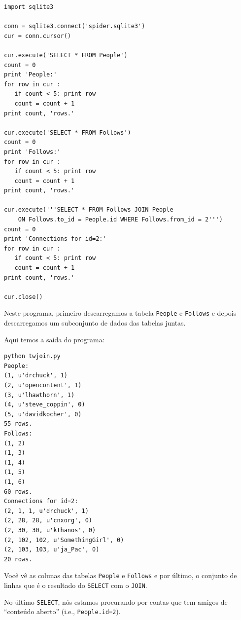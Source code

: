 \beforeverb
\begin{verbatim}
import sqlite3

conn = sqlite3.connect('spider.sqlite3')
cur = conn.cursor()

cur.execute('SELECT * FROM People')
count = 0
print 'People:'
for row in cur :
   if count < 5: print row
   count = count + 1
print count, 'rows.'

cur.execute('SELECT * FROM Follows')
count = 0
print 'Follows:'
for row in cur :
   if count < 5: print row
   count = count + 1
print count, 'rows.'

cur.execute('''SELECT * FROM Follows JOIN People 
    ON Follows.to_id = People.id WHERE Follows.from_id = 2''')
count = 0
print 'Connections for id=2:'
for row in cur :
   if count < 5: print row
   count = count + 1
print count, 'rows.'

cur.close()
\end{verbatim}
\afterverb
%

%
Neste programa, primeiro descarregamos a tabela {\tt People} e {\tt Follows} e
depois descarregamos um subconjunto de dados das tabelas juntas.


Aqui temos a saída do programa:

\beforeverb
\begin{verbatim}
python twjoin.py 
People:
(1, u'drchuck', 1)
(2, u'opencontent', 1)
(3, u'lhawthorn', 1)
(4, u'steve_coppin', 0)
(5, u'davidkocher', 0)
55 rows.
Follows:
(1, 2)
(1, 3)
(1, 4)
(1, 5)
(1, 6)
60 rows.
Connections for id=2:
(2, 1, 1, u'drchuck', 1)
(2, 28, 28, u'cnxorg', 0)
(2, 30, 30, u'kthanos', 0)
(2, 102, 102, u'SomethingGirl', 0)
(2, 103, 103, u'ja_Pac', 0)
20 rows.
\end{verbatim}
\afterverb
%

%
Você vê as colunas das tabelas {\tt People} e {\tt Follows} e por último, o
conjunto de linhas que é o resultado do {\tt SELECT} com o {\tt JOIN}.


No último {\tt SELECT}, nós estamos procurando por contas que tem amigos de
``conteúdo aberto'' (i.e., {\tt People.id=2}).

